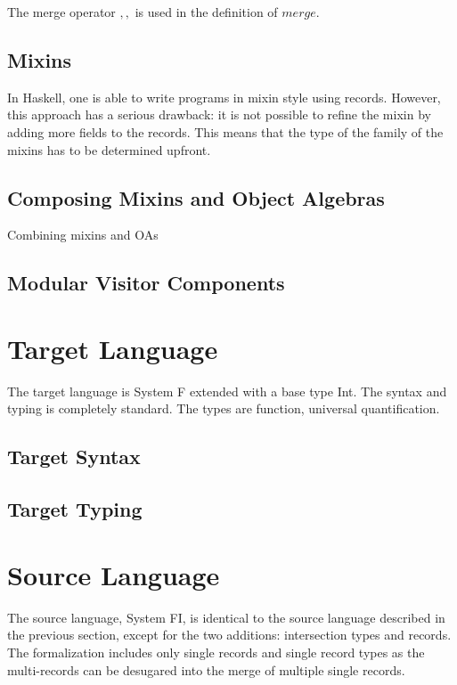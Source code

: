 \documentclass[preprint]{sigplanconf}
\begin{document}
The merge operator $ ,, $ is used in the definition of $ merge $.



\subsection{Mixins}

In Haskell, one is able to write programs in mixin style using records. However,
this approach has a serious drawback: it is not possible to refine the mixin by
adding more fields to the records. This means that the type of the family of the
mixins has to be determined upfront.


\subsection{Composing Mixins and Object Algebras}

Combining mixins and OAs

\subsection{Modular Visitor Components}

\section{Target Language}

The target language is System F extended with a base type Int. The syntax and
typing is completely standard. The types are function, universal quantification.

\subsection{Target Syntax}

\subsection{Target Typing}

\section{Source Language}

The source language, System FI, is identical to the source language described in
the previous section, except for the two additions: intersection types and
records. The formalization includes only single records and single record types as the multi-records can be desugared into the merge of multiple single records.
\end{document}

